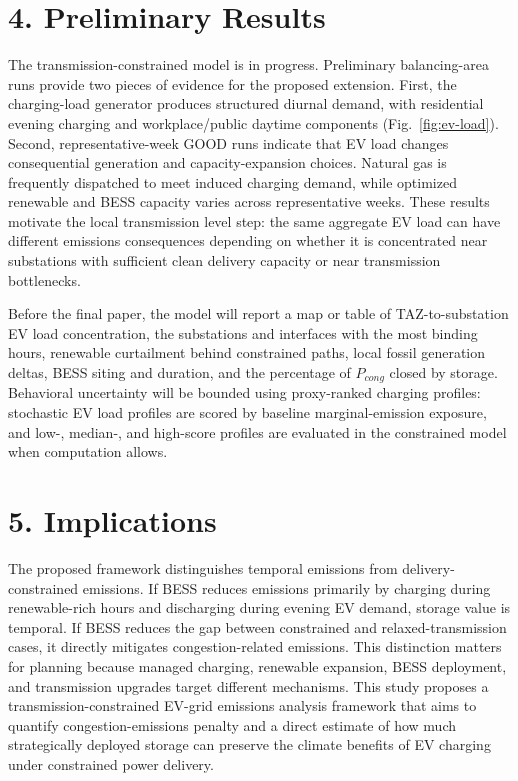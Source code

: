 \documentclass[11pt]{article}
\begin{document}
\section*{4. Preliminary Results}

The transmission-constrained model is in progress. Preliminary balancing-area runs provide two pieces of evidence for the proposed extension. First, the charging-load generator produces structured diurnal demand, with residential evening charging and workplace/public daytime components (Fig.~\ref{fig:ev-load}). Second, representative-week GOOD runs indicate that EV load changes consequential generation and capacity-expansion choices. Natural gas is frequently dispatched to meet induced charging demand, while optimized renewable and BESS capacity varies across representative weeks. These results motivate the local transmission level step: the same aggregate EV load can have different emissions consequences depending on whether it is concentrated near substations with sufficient clean delivery capacity or near transmission bottlenecks.

Before the final paper, the model will report a map or table of TAZ-to-substation EV load concentration, the substations and interfaces with the most binding hours, renewable curtailment behind constrained paths, local fossil generation deltas, BESS siting and duration, and the percentage of $P_{cong}$ closed by storage. Behavioral uncertainty will be bounded using proxy-ranked charging profiles: stochastic EV load profiles are scored by baseline marginal-emission exposure, and low-, median-, and high-score profiles are evaluated in the constrained model when computation allows.

\section*{5. Implications}

The proposed framework distinguishes temporal emissions from delivery-constrained emissions. If BESS reduces emissions primarily by charging during renewable-rich hours and discharging during evening EV demand, storage value is temporal. If BESS reduces the gap between constrained and relaxed-transmission cases, it directly mitigates congestion-related emissions. This distinction matters for planning because managed charging, renewable expansion, BESS deployment, and transmission upgrades target different mechanisms. This study proposes a transmission-constrained EV-grid emissions analysis framework that aims to quantify congestion-emissions penalty and a direct estimate of how much strategically deployed storage can preserve the climate benefits of EV charging under constrained power delivery.

\newpage
\begingroup
\footnotesize


\endgroup
\end{document}
